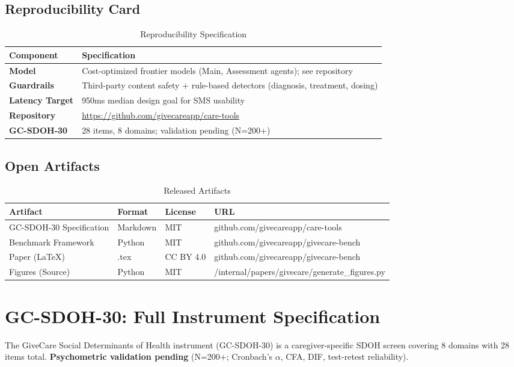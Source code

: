 \documentclass{article}
\begin{document}
\subsection{Reproducibility Card}%
\label{subsec:ReproducibilityCard}%
\begin{table}[htbp]
\centering
\caption{Reproducibility Specification}
\label{tab:reproducibility-gc}
\small
\begin{tabular}{lp{9cm}}
\toprule
\textbf{Component} & \textbf{Specification} \\
\midrule
\textbf{Model} & Cost-optimized frontier models (Main, Assessment agents); see repository \\
\textbf{Guardrails} & Third-party content safety + rule-based detectors (diagnosis, treatment, dosing) \\
\textbf{Latency Target} & 950ms median design goal for SMS usability \\
\textbf{Repository} & \url{https://github.com/givecareapp/care-tools} \\
\textbf{GC-SDOH-30} & 28 items, 8 domains; validation pending (N=200+) \\
\bottomrule
\end{tabular}
\end{table}
\subsection{Open Artifacts}%
\label{subsec:OpenArtifacts}%
\begin{table}[htbp]
\centering
\caption{Released Artifacts}
\label{tab:artifacts-gc}
\small
\begin{tabular}{llll}
\toprule
\textbf{Artifact} & \textbf{Format} & \textbf{License} & \textbf{URL} \\
\midrule
GC-SDOH-30 Specification & Markdown & MIT & github.com/givecareapp/care-tools \\
Benchmark Framework & Python & MIT & github.com/givecareapp/givecare-bench \\
Paper (LaTeX) & .tex & CC BY 4.0 & github.com/givecareapp/givecare-bench \\
Figures (Source) & Python & MIT & /internal/papers/givecare/generate\_figures.py \\
\bottomrule
\end{tabular}
\end{table}
\section{GC-SDOH-30: Full Instrument Specification}%
\label{app:gc-sdoh-28}%
The GiveCare Social Determinants of Health instrument (GC-SDOH-30) is a caregiver-specific SDOH screen covering 8 domains with 28 items total. \textbf{Psychometric validation pending} (N=200+; Cronbach's $\alpha$, CFA, DIF, test-retest reliability).
\end{document}
